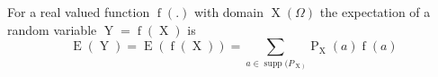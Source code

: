 For a real valued function $\operatorname{f}(.)$ with domain $\operatorname{X}(\Omega)$ the expectation of a random variable $\operatorname{Y} = \operatorname{f}(\operatorname{X})$ is
$$\operatorname{E}(\operatorname{Y}) = \operatorname{E}(\operatorname{f}(\operatorname{X})) = \sum\limits_{a \in \operatorname{supp}(P_{\operatorname{X})}} \operatorname{P}_{\operatorname{X}}(a) \operatorname{f}(a)$$
